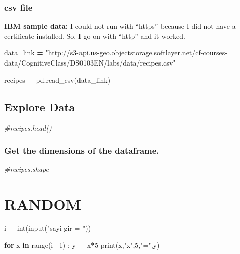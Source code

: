 \documentclass[
]{book}
\newenvironment{Shaded}{\begin{snugshade}}{\end{snugshade}}
\newcommand{\BuiltInTok}[1]{#1}
\newcommand{\CommentTok}[1]{\textcolor[rgb]{0.56,0.35,0.01}{\textit{#1}}}
\newcommand{\ControlFlowTok}[1]{\textcolor[rgb]{0.13,0.29,0.53}{\textbf{#1}}}
\newcommand{\DecValTok}[1]{\textcolor[rgb]{0.00,0.00,0.81}{#1}}
\newcommand{\KeywordTok}[1]{\textcolor[rgb]{0.13,0.29,0.53}{\textbf{#1}}}
\newcommand{\NormalTok}[1]{#1}
\newcommand{\OperatorTok}[1]{\textcolor[rgb]{0.81,0.36,0.00}{\textbf{#1}}}
\newcommand{\StringTok}[1]{\textcolor[rgb]{0.31,0.60,0.02}{#1}}
\begin{document}
\hypertarget{csv-file}{%
\subsection{csv file}\label{csv-file}}

\textbf{IBM sample data:} I could not run with ``https'' because I did not have a certificate installed. So, I go on with ``http'' and it worked.

\begin{Shaded}
\begin{Highlighting}[]
\NormalTok{data\_link }\OperatorTok{=} \StringTok{"http://s3{-}api.us{-}geo.objectstorage.softlayer.net/cf{-}courses{-}data/CognitiveClass/DS0103EN/labs/data/recipes.csv"}

\NormalTok{recipes }\OperatorTok{=}\NormalTok{ pd.read\_csv(data\_link)}
\end{Highlighting}
\end{Shaded}

\hypertarget{explore-data}{%
\section{Explore Data}\label{explore-data}}

\begin{Shaded}
\begin{Highlighting}[]
\CommentTok{\#recipes.head()}
\end{Highlighting}
\end{Shaded}

\hypertarget{get-the-dimensions-of-the-dataframe.}{%
\subsection{Get the dimensions of the dataframe.}\label{get-the-dimensions-of-the-dataframe.}}

\begin{Shaded}
\begin{Highlighting}[]
\CommentTok{\#recipes.shape}
\end{Highlighting}
\end{Shaded}

\hypertarget{random}{%
\chapter{RANDOM}\label{random}}

\begin{Shaded}
\begin{Highlighting}[]
\NormalTok{i }\OperatorTok{=} \BuiltInTok{int}\NormalTok{(}\BuiltInTok{input}\NormalTok{(}\StringTok{"sayi gir = "}\NormalTok{))}

\ControlFlowTok{for}\NormalTok{ x }\KeywordTok{in} \BuiltInTok{range}\NormalTok{(i}\OperatorTok{+}\DecValTok{1}\NormalTok{) :}
\NormalTok{  y }\OperatorTok{=}\NormalTok{ x}\OperatorTok{*}\DecValTok{5}
  \BuiltInTok{print}\NormalTok{(x,}\StringTok{"x"}\NormalTok{,}\DecValTok{5}\NormalTok{,}\StringTok{"="}\NormalTok{,y)}
\end{Highlighting}
\end{Shaded}
\end{document}
